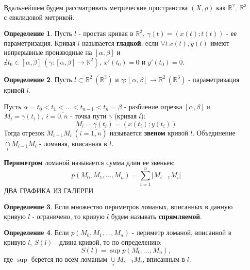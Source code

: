\documentclass{report}
\theoremstyle{definition}
\newtheorem{definition}{Определение}[section]
\begin{document}
Вдальнейшем будем рассматривать метрические пространства $(X,\rho)$ как $\mathbb{R}^2, \ \mathbb{R}^3$
с евклидовой метрикой.

\begin{definition}
  Пусть $l$ - простая кривая в $\mathbb{R}^2, \ \gamma(t) = (x(t);t(t))$ - ее параметризация.
  Кривая $l$ называется \textbf{гладкой}, если $\forall t \ x(t),y(t)$ имеют непрерывные производные
  на $[\alpha,\beta]$ и $\nexists t_0 \in [\alpha,\beta] \ (\gamma : [\alpha,\beta] \rightarrow
    \mathbb{R}^2), \ x'(t_0)=0$ и $y'(t_0) = 0$.
\end{definition}

\begin{definition}
  Пусть $l \subset \mathbb{R}^2 \ (\mathbb{R}^3)$ и $\gamma:[\alpha,\beta]\rightarrow\mathbb{R}^2 \
    (\mathbb{R}^3)$ - параметризация кривой $l$.

  Пусть $\alpha = t_0 < t_1 < \ldots < t_{n-1} < t_n = \beta$ - разбиение отрезка $[\alpha,\beta]$
  и $M_i = \gamma(t_i), \ i=\overline{0,n}$ - точка пути $\gamma$ (кривая $l$):
  \begin{equation*}
    M_i = \gamma (t_i) = (x(t_i);y(t_i))
  \end{equation*}
  Тогда отрезок $M_{i-1}M_i \ (i = \overline{1,n})$ называется \textbf{звеном} кривой $l$.
  Объединение $\underset{i}{\cap}M_{i-1}M_i$ - ломаная, вписанная в $l$.

  \textbf{Периметром} ломаной называется сумма длин ее звеньев:
  \begin{equation*}
    p(M_0,M_1,\ldots,M_n) = \sum_{i=1}^{n}| M_{i-1}M_i |
  \end{equation*}
  {\Large ДВА ГРАФИКА ИЗ ГАЛЕРЕИ}
\end{definition}

\begin{definition}
  Если множество периметров ломаных, вписанных в данную кривую $l$ - ограничено, то кривую $l$
  будем называть \textbf{спрямляемой}.
\end{definition}

\begin{definition}
  Если $p(M_0,M_1,\ldots,M_n)$ - периметр ломаной, вписанной в кривую $l, \ S(l)$ - длина кривой, то
  по определению:
  \begin{equation*}
    S(l) = \sup p(M_0,\ldots,M_n),
  \end{equation*}
  где $\sup$ берется по всем ломаным $\underset{i}{\cup} M_{i-1}M_i$, вписанным в $l$.
\end{definition}
\end{document}
